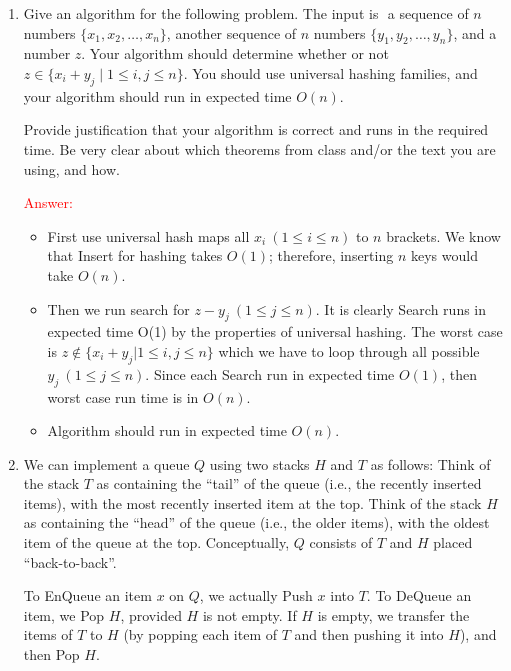 \documentclass[11pt,twoside]{article}
\begin{document}
\begin{enumerate}[leftmargin=0pt]





\item 
Give an algorithm for the following problem. The input is $ $ a sequence
of $n$ numbers $\{ x_1, x_2, \ldots, x_n \}$, another sequence of
$n$ numbers $\{y_1, y_2, \ldots, y_n \}$, and a number $z$. Your
algorithm should determine whether or not
$z \in \{ x_i + y_j \mid 1 \leq i, j \leq n \}$. You should use
universal hashing families, and your algorithm should run in
expected time $O(n)$.

Provide justification that your algorithm is correct and runs
in the required time. Be very clear about which theorems from class
and/or the text you are using, and how.

\textcolor{red}{\sc Answer:}
\begin{itemize}[label = {}]
\item First use universal hash maps all $x_{i} \ (1\leq i \leq n)$ to $n$ brackets. 
 We know that {\sc Insert} for hashing takes $O(1)$; therefore, inserting $n$ keys would take $O(n)$.
\item Then we run search for $z-y_{j} \ (1\leq j \leq n)$. It is clearly {\sc Search} runs in expected time O(1) by the properties of universal hashing.
The worst case is $z \notin \{x_{i}+y_{j} |1\leq i,j \leq n\}$ which we have to loop through all possible  $y_{j} \ (1\leq j \leq n)$. 
Since each {\sc Search} run in expected time $O(1)$, then worst case run time is in $O(n)$.
\item  Algorithm should run in expected time $O(n)$.
\end{itemize}


\item
We can implement a queue $Q$ using two stacks $H$ and $T$ as follows:
Think of the stack $T$ as containing the ``tail'' of the queue
        (i.e., the recently inserted items),
        with the most recently inserted item at the top.
Think of the stack $H$ as containing the ``head'' of the queue
        (i.e., the older items),
        with the oldest item of the queue at the top.
Conceptually, $Q$ consists of $T$ and $H$ placed ``back-to-back''.

To {\sc EnQueue} an item $x$ on $Q$, we actually {\sc Push} $x$ into $T$.
To {\sc DeQueue} an item, we {\sc Pop} $H$, provided $H$ is not empty.
If $H$ is empty, we transfer the items of $T$ to $H$ (by popping each item of $T$
        and then pushing it into $H$), and then {\sc Pop} $H$.



\end{enumerate}
\end{document}
